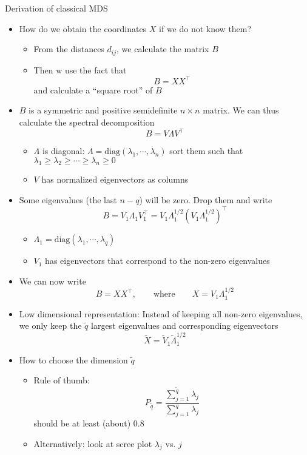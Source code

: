 \documentclass[a4paper]{article}
\begin{document}
Derivation of classical MDS
\begin{itemize}
    \item How do we obtain the coordinates $X$ if we do not know them?
    \begin{itemize}
        \item From the distances $d_{ij}$, we calculate the matrix $B$
        \item Then w use the fact that 
        \[B=XX^{\intercal} \]
        and calculate a ``square root'' of $B$
    \end{itemize}
    \item $B$ is a symmetric and positive semidefinite $n\times n$ matrix. We can thus calculate the spectral decomposition
    \[B=V\Lambda V^{\intercal} \]
    \begin{itemize}
        \item $\Lambda$ is diagonal: $\Lambda=\text{diag}(\lambda_1,\cdots,\lambda_n)$
        sort them such that $\lambda_1\geq\lambda_2\geq\cdots\geq\lambda_n\geq0$
        \item $V$ has normalized eigenvectors as columns
    \end{itemize}
    \item Some eigenvalues (the last $n-q$) will be zero. Drop them and write
    \[B=V_1\Lambda_1V_1^{\intercal}=V_1\Lambda_1^{1/2}\left(V_1\Lambda_1^{1/2}\right)^{\intercal} \]
    \begin{itemize}
        \item $\Lambda_1=\text{diag}(\lambda_1,\cdots,\lambda_q)$
        \item $V_1$ has eigenvectors that correspond to the non-zero eigenvalues
    \end{itemize}
    \item We can now write
    \[B=XX^{\intercal},\qquad \text{where}\qquad X=V_1\Lambda_1^{1/2} \]
    \item Low dimensional representation: Instead of keeping all non-zero eigenvalues, we only keep the $\tilde{q}$ largest eigenvalues and corresponding eigenvectors
    \[\widetilde{X}=\widetilde{V}_1\widetilde{\Lambda}_1^{1/2} \]
    \item How to choose the dimension $\tilde{q}$
    \begin{itemize}
        \item Rule of thumb:
        \[P_{\tilde{q}}=\frac{\sum_{j=1}^{\tilde{q}}\lambda_j}{\sum_{j=1}^{q}\lambda_j} \]
        should be at least (about) 0.8
        \item Alternatively: look at scree plot $\lambda_j$ vs. $j$
    \end{itemize}
\end{itemize}
\end{document}

